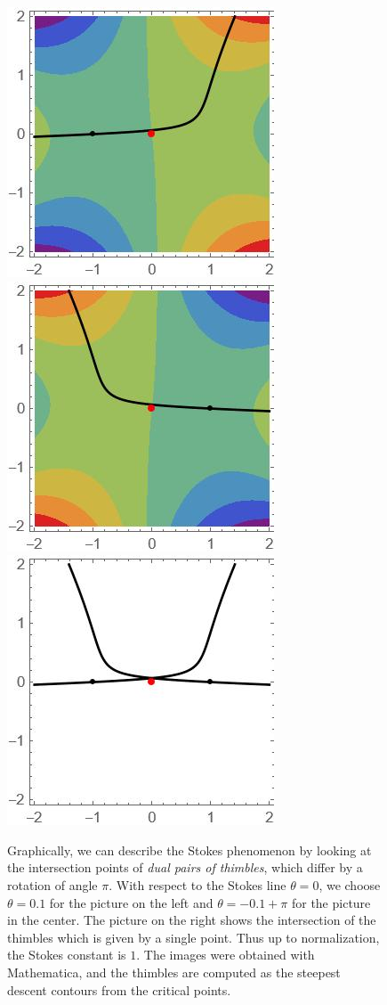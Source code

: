 \documentclass{article}
\theoremstyle{definition}
\theoremstyle{plain}
\begin{document}
\begin{figure}[ht]
    \centering
    \includegraphics[scale=0.7]{figures/contour1--airy.jpg}
    \includegraphics[scale=0.7]{figures/contour2--airy.jpg}
     \includegraphics[scale=0.7]{figures/contour--Airy--intersection.jpg}
    \caption{Graphically, we can describe the Stokes phenomenon by looking at the intersection points of \textit{dual pairs of thimbles}, which differ by a rotation of angle $\pi$. With respect to the Stokes line $\theta=0$, we choose $\theta=0.1$ for the picture on the left and $\theta=-0.1+\pi$ for the picture in the center. The picture on the right shows the intersection of the thimbles which is given by a single point. Thus up to normalization, the Stokes constant is $1$. The images were obtained with Mathematica, and the thimbles are computed as the steepest descent contours from the critical points.}
    \label{fig:intersection_thimbles-Airy}
\end{figure}
\end{document}
